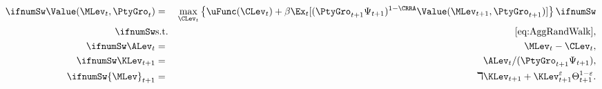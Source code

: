 \begin{eqnarray}
\ifnumSw  \Value(\MLev_{t},\PtyGro_t) & = & \max_{\CLev_{t}} \left\{ \uFunc(\CLev_{t}) + \beta \Ex_{t}[ (\PtyGro_{t+1}\Psi_{t+1})^{1-\CRRA} \Value(\MLev_{t+1},\PtyGro_{t+1})]\right\} \nonumber \ifnumSw
\\ \ifnumSw & \mbox{s.t.} & \eqref{eq:AggRandWalk}, \label{eq:DSGEscaledV}
\\ \ifnumSw \ALev_{t} & = & \MLev_{t}-\CLev_{t}, \nonumber
\\ \ifnumSw \KLev_{t+1} & = & \ALev_{t} / (\PtyGro_{t+1} \Psi_{t+1}), \label{eq:Ktp1DSGE}  \nonumber
\\ \ifnumSw {\MLev}_{t+1} & = & \daleth \KLev_{t+1} + \KLev_{t+1}^{\varepsilon} \Theta_{t+1}^{1-\varepsilon}. \label{eq:Mtp1DSGE}    \nonumber
\end{eqnarray}

